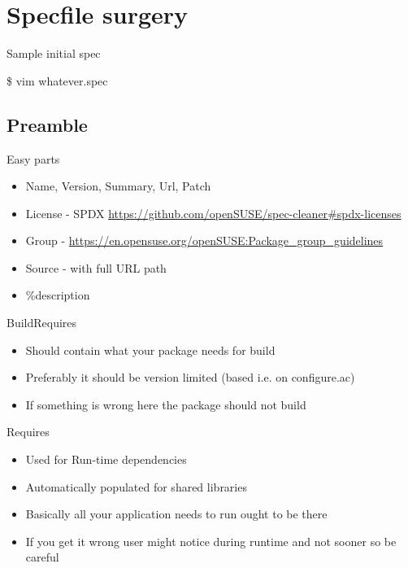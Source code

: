 \documentclass{beamer}
\begin{document}
\section{Specfile surgery}

\begin{frame}[t]{Sample initial spec}
	\begin{center}\$ vim whatever.spec\end{center}
\end{frame}

\subsection{Preamble}

\begin{frame}[t]{Easy parts}
	\begin{itemize}
	\item Name, Version, Summary, Url, Patch
    \item License - SPDX \url{https://github.com/openSUSE/spec-cleaner\#spdx-licenses}
    \item Group - \url{https://en.opensuse.org/openSUSE:Package\_group\_guidelines}
    \item Source - with full URL path
    \item \%description
	\end{itemize}
\end{frame}

\begin{frame}[t]{BuildRequires}
	\begin{itemize}
	\item Should contain what your package needs for build
    \item Preferably it should be version limited (based i.e. on configure.ac)
    \item If something is wrong here the package should not build
	\end{itemize}
\end{frame}

\begin{frame}[t]{Requires}
	\begin{itemize}
    \item Used for Run-time dependencies
    \item Automatically populated for shared libraries
    \item Basically all your application needs to run ought to be there
    \item If you get it wrong user might notice during runtime and not sooner so be careful
	\end{itemize}
\end{frame}
\end{document}
